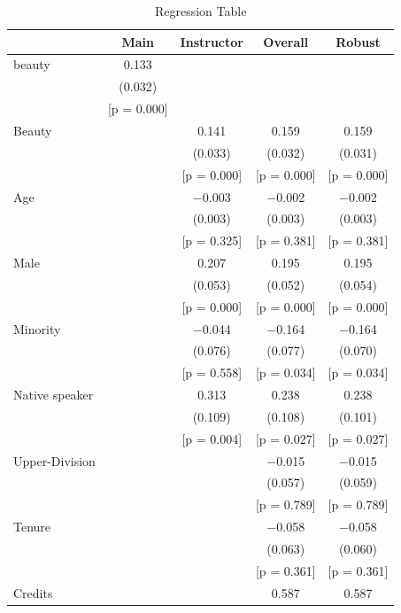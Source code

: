 \documentclass[
  12 pt,
]{article}
\begin{document}
\begin{table}

\caption{\label{tab:reg1output}Regression Table}
\centering
\begin{tabular}[t]{lcccc}
\toprule
  & Main & Instructor & Overall & Robust\\
\midrule
beauty & \num{0.133} &  &  & \\
 & (\num{0.032}) &  &  & \\
 & {}[p = \num{0.000}] &  &  & \\
Beauty &  & \num{0.141} & \num{0.159} & \num{0.159}\\
 &  & (\num{0.033}) & (\num{0.032}) & (\num{0.031})\\
 &  & {}[p = \num{0.000}] & {}[p = \num{0.000}] & {}[p = \vphantom{1} \num{0.000}]\\
Age &  & \num{-0.003} & \num{-0.002} & \num{-0.002}\\
 &  & (\num{0.003}) & (\num{0.003}) & (\num{0.003})\\
 &  & {}[p = \num{0.325}] & {}[p = \num{0.381}] & {}[p = \num{0.381}]\\
Male &  & \num{0.207} & \num{0.195} & \num{0.195}\\
 &  & (\num{0.053}) & (\num{0.052}) & (\num{0.054})\\
 &  & {}[p = \num{0.000}] & {}[p = \num{0.000}] & {}[p = \num{0.000}]\\
Minority &  & \num{-0.044} & \num{-0.164} & \num{-0.164}\\
 &  & (\num{0.076}) & (\num{0.077}) & (\num{0.070})\\
 &  & {}[p = \num{0.558}] & {}[p = \num{0.034}] & {}[p = \num{0.034}]\\
Native speaker &  & \num{0.313} & \num{0.238} & \num{0.238}\\
 &  & (\num{0.109}) & (\num{0.108}) & (\num{0.101})\\
 &  & {}[p = \num{0.004}] & {}[p = \num{0.027}] & {}[p = \num{0.027}]\\
Upper-Division &  &  & \num{-0.015} & \num{-0.015}\\
 &  &  & (\num{0.057}) & (\num{0.059})\\
 &  &  & {}[p = \num{0.789}] & {}[p = \num{0.789}]\\
Tenure &  &  & \num{-0.058} & \num{-0.058}\\
 &  &  & (\num{0.063}) & (\num{0.060})\\
 &  &  & {}[p = \num{0.361}] & {}[p = \num{0.361}]\\
Credits &  &  & \num{0.587} & \num{0.587}\\

\end{tabular}
\end{table}
\end{document}
